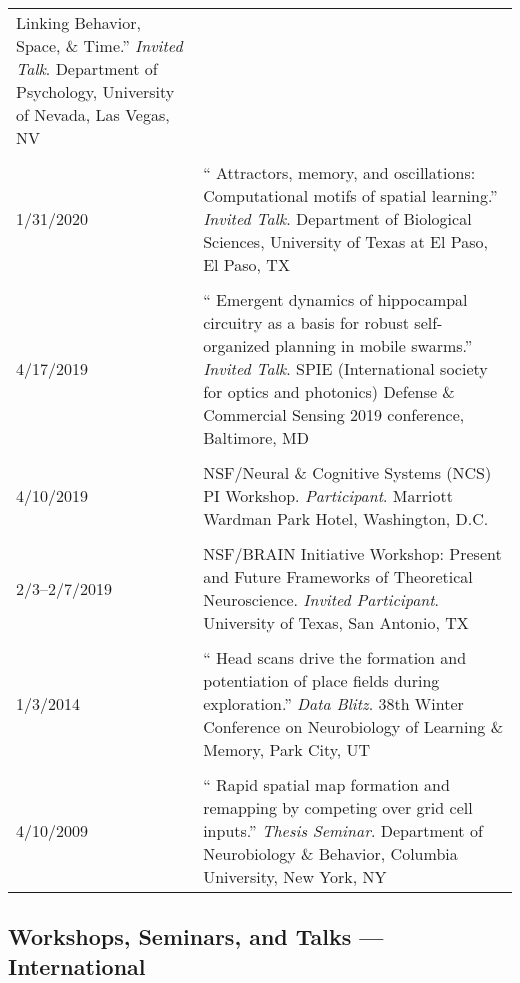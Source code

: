 \documentclass[10pt]{article}
\newcommand{\unpubtitle}[1]{{\color{hopkinsblue} #1}}
\begin{document}
\begin{longtable}{@{\hspace{0.2in}}l>{\raggedright\arraybackslash}p{}}
{  Linking Behavior, Space, \& Time}.'' \emph{Invited Talk}. Department of
  Psychology, University of Nevada, Las Vegas, NV\\
  \tabularnewline
  1/31/2020 \hspace{0.3in} & ``\unpubtitle{Attractors, memory, and oscillations:
  Computational motifs of spatial learning}.'' \emph{Invited Talk}.
  Department of Biological Sciences, University of Texas at El Paso, El Paso, TX\\
  \tabularnewline
  4/17/2019 \hspace{0.3in} & ``\unpubtitle{Emergent dynamics of hippocampal
  circuitry as a basis for robust self-organized planning in mobile swarms}.''
  \emph{Invited Talk}. SPIE (International society for optics and photonics)
  Defense \& Commercial Sensing 2019 conference, Baltimore, MD\\
  \tabularnewline
  4/10/2019 & NSF/Neural \& Cognitive Systems (NCS) PI
  Workshop. \emph{Participant}. Marriott Wardman Park Hotel, Washington, D.C.\\
  \tabularnewline
  2/3--2/7/2019 & NSF/BRAIN Initiative Workshop: Present and Future Frameworks
  of Theoretical Neuroscience. \emph{Invited Participant}. University of Texas,
  San Antonio, TX\\
  \tabularnewline
  1/3/2014 & ``\unpubtitle{Head scans drive the formation and potentiation
  of place fields during exploration}.'' \emph{Data Blitz}. 38th Winter
  Conference on Neurobiology of Learning \& Memory, Park City, UT\\
  \tabularnewline
  4/10/2009 & ``\unpubtitle{Rapid spatial map formation and remapping by
  competing over grid cell inputs}.'' \emph{Thesis Seminar}. Department of
  Neurobiology \& Behavior, Columbia University, New York, NY\\
\end{longtable}

\subsection*{Workshops, Seminars, and Talks --- International}
\label{sec:talksintl}
\end{document}
